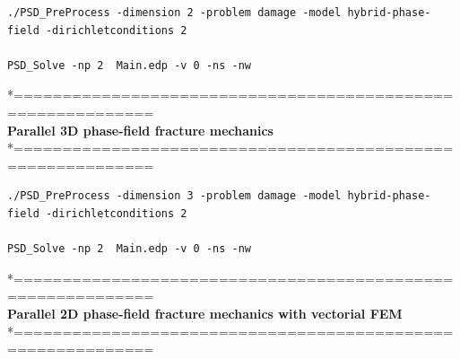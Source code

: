\documentclass{report}
\begin{document}
\begin{lstlisting}[style=Linux]
./PSD_PreProcess -dimension 2 -problem damage -model hybrid-phase-field -dirichletconditions 2   

PSD_Solve -np 2  Main.edp -v 0 -ns -nw   
\end{lstlisting}
*============================================================\\
\textbf{ Parallel 3D phase-field fracture mechanics} \\
*============================================================\\
\begin{lstlisting}[style=Linux]
./PSD_PreProcess -dimension 3 -problem damage -model hybrid-phase-field -dirichletconditions 2   

PSD_Solve -np 2  Main.edp -v 0 -ns -nw   
\end{lstlisting}
*============================================================\\
\textbf{ Parallel 2D phase-field fracture mechanics with vectorial FEM } \\
*============================================================\\
\end{document}
